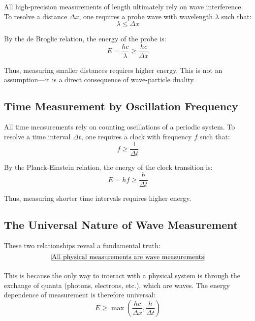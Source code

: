 \documentclass[aps,preprint,showpacs,showkeys]{revtex4}%
\begin{document}
All high-precision measurements of length ultimately rely on wave
interference. To resolve a distance $\Delta x$, one requires a probe wave
with wavelength $\lambda$ such that: 
\begin{equation}
\lambda \le \Delta x
\end{equation}

By the de Broglie relation, the energy of the probe is: 
\begin{equation}
E = \frac{hc}{\lambda} \ge \frac{hc}{\Delta x}
\end{equation}

Thus, measuring smaller distances requires higher energy. This is not an
assumption---it is a direct consequence of wave-particle duality.

\subsection{Time Measurement by Oscillation Frequency}

All time measurements rely on counting oscillations of a periodic system. To
resolve a time interval $\Delta t$, one requires a clock with frequency $f$
such that: 
\begin{equation}
f \ge \frac{1}{\Delta t}
\end{equation}

By the Planck-Einstein relation, the energy of the clock transition is: 
\begin{equation}
E = hf \ge \frac{h}{\Delta t}
\end{equation}

Thus, measuring shorter time intervals requires higher energy.

\subsection{The Universal Nature of Wave Measurement}

These two relationships reveal a fundamental truth: 
\begin{equation}
\frame{All physical measurements are wave measurements}
\end{equation}

This is because the only way to interact with a physical system is through
the exchange of quanta (photons, electrons, etc.), which are waves. The
energy dependence of measurement is therefore universal: 
\begin{equation}
E \ge \max\left(\frac{hc}{\Delta x}, \frac{h}{\Delta t}\right)
\end{equation}
\end{document}
